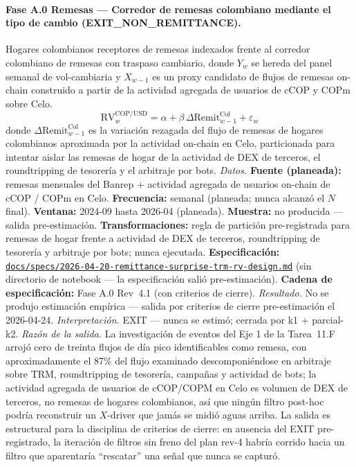 \documentclass[11pt,a4paper]{article}
\theoremstyle{plain}
\begin{document}
\paragraph{Fase A.0 Remesas --- Corredor de remesas colombiano mediante el tipo de cambio (EXIT\_NON\_REMITTANCE).}
Hogares colombianos receptores de remesas indexados frente al corredor colombiano de remesas con traspaso cambiario, donde \(Y_w\) se hereda del panel semanal de vol-cambiaria y \(X_{w-1}\) es un proxy candidato de flujos de remesas on-chain construido a partir de la actividad agregada de usuarios de cCOP y COPm sobre Celo.
\[ \mathrm{RV}^{\mathrm{COP/USD}}_w = \alpha + \beta\, \Delta \mathrm{Remit}^{\mathrm{Col}}_{w-1} + \varepsilon_w \]
donde \(\Delta \mathrm{Remit}^{\mathrm{Col}}_{w-1}\) es la variación rezagada del flujo de remesas de hogares colombianos aproximada por la actividad on-chain en Celo, particionada para intentar aislar las remesas de hogar de la actividad de DEX de terceros, el roundtripping de tesorería y el arbitraje por bots.
\textit{Datos.} \textbf{Fuente (planeada):} remesas mensuales del Banrep + actividad agregada de usuarios on-chain de cCOP / COPm en Celo. \textbf{Frecuencia:} semanal (planeada; nunca alcanzó el \(N\) final). \textbf{Ventana:} 2024-09 hasta 2026-04 (planeada). \textbf{Muestra:} no producida --- salida pre-estimación. \textbf{Transformaciones:} regla de partición pre-registrada para remesas de hogar frente a actividad de DEX de terceros, roundtripping de tesorería y arbitraje por bots; nunca ejecutada. \textbf{Especificación:} \href{https://github.com/JMSBPP/abrigo-analytics/blob/master/docs/specs/2026-04-20-remittance-surprise-trm-rv-design.md}{\texttt{docs/specs/2026-04-20-remittance-surprise-trm-rv-design.md}} (sin directorio de notebook --- la especificación salió pre-estimación). \textbf{Cadena de especificación:} Fase A.0 Rev~4.1 (con criterios de cierre).
\textit{Resultado.} No se produjo estimación empírica --- salida por criterios de cierre pre-estimación el 2026-04-24.
\textit{Interpretación.} EXIT --- nunca se estimó; cerrada por k1 + parcial-k2.
\textit{Razón de la salida.} La investigación de eventos del Eje 1 de la Tarea~11.F arrojó cero de treinta flujos de día pico identificables como remesa, con aproximadamente el 87\% del flujo examinado descomponiéndose en arbitraje sobre TRM, roundtripping de tesorería, campañas y actividad de bots; la actividad agregada de usuarios de cCOP/COPM en Celo es volumen de DEX de terceros, no remesas de hogares colombianos, así que ningún filtro post-hoc podría reconstruir un \(X\)-driver que jamás se midió aguas arriba. La salida es estructural para la disciplina de criterios de cierre: en ausencia del EXIT pre-registrado, la iteración de filtros sin freno del plan rev-4 habría corrido hacia un filtro que aparentaría ``rescatar'' una señal que nunca se capturó.
\end{document}
